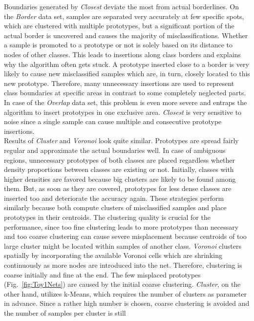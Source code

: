 \documentclass[conference]{IEEEtran}
\begin{document}
Boundaries generated by \textit{Closest} deviate the most from actual borderlines.
On the \textit{Border} data set, samples are separated very accurately at few specific spots, 
which are clustered with multiple prototypes, but a significant portion of the actual border is uncovered and causes the majority
of misclassifications. Whether a sample is promoted to a prototype or not is solely based on its distance to nodes of other classes. This leads to insertions along 
class borders and explains why the algorithm often gets stuck. A prototype inserted close to a border is very likely to cause new misclassified samples
which are, in turn, closely located to this new prototype. Therefore, many unnecessary insertions
are used to represent class boundaries at specific areas in contrast to some completely neglected parts.
In case of the \textit{Overlap} data set, this problem is even more severe and entraps the algorithm to insert prototypes in one exclusive 
area. \textit{Closest} is very sensitive to noise since a single sample can cause multiple and consecutive prototype insertions.\\
Results of \textit{Cluster} and \textit{Voronoi} look quite similar. Prototypes are spread fairly regular and approximate the actual boundaries well.
In case of ambiguous regions, unnecessary prototypes of both classes are placed regardless whether density proportions between classes are existing or not.
Initially, classes with higher densities are favored because big clusters are likely to be found among them. 
But, as soon as they are covered, prototypes for less dense classes are inserted too and deteriorate the accuracy again.
These strategies perform similarly because both compute clusters of misclassified samples and place prototypes in their centroids. 
The clustering quality is crucial for the performance, since too fine clustering leads to more prototypes than necessary
and too coarse clustering can cause severe misplacement because centroids of too large cluster might be located within samples of another class.
\textit{Voronoi} clusters spatially by incorporating the available Voronoi cells which are shrinking continuously as more nodes are introduced into the net.
Therefore, clustering is coarse initially and fine at the end. The few misplaced prototypes (Fig.~\ref{fig:Toy1Nets}) are caused by the initial coarse clustering.
\textit{Cluster}, on the other hand, utilizes k-Means, which requires the number of clusters as parameter in advance. 
Since a rather high number is chosen, coarse clustering is avoided and the number of samples per cluster is still 
\end{document}
